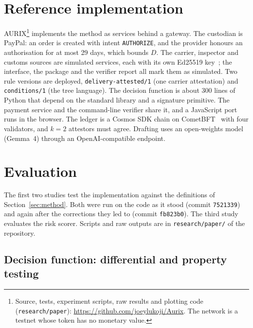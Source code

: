 \documentclass[10pt,a4paper]{article}
\newcommand{\code}[1]{\texttt{\small #1}}
\theoremstyle{tight}
\begin{document}
\section{Reference implementation}\label{sec:impl}

AURIX\footnote{Source, tests, experiment scripts, raw results and plotting code (\code{research/paper}): \url{https://github.com/joeylukoji/Aurix}. The
network is a testnet whose token has no monetary value.} implements the method as services behind a gateway. The
custodian is PayPal: an order is created with intent \code{AUTHORIZE}, and the provider honours an authorisation for
at most 29 days, which bounds $D$. The carrier, inspector and customs sources are simulated services, each with its
own Ed25519 key~\cite{bernstein2012}; the interface, the package and the verifier report all mark them as
simulated. Two rule versions are deployed, \code{delivery-attested/1} (one carrier attestation) and
\code{conditions/1} (the tree language). The decision function is about 300 lines of Python that depend on the
standard library and a signature primitive. The payment service and the command-line verifier share it, and a
JavaScript port runs in the browser. The ledger is a Cosmos SDK chain on CometBFT~\cite{buchman2018} with four
validators, and $k = 2$ attestors must agree. Drafting uses an open-weights model (Gemma~4) through an
OpenAI-compatible endpoint.

\section{Evaluation}\label{sec:eval}

The first two studies test the implementation against the definitions of Section~\ref{sec:method}. Both were run on
the code as it stood (commit \code{7521339}) and again after the corrections they led to (commit \code{fb823b0}). The
third study evaluates the risk scorer. Scripts and raw outputs are in \code{research/paper/} of the repository.

\subsection{Decision function: differential and property testing}\label{sec:diff}
\end{document}
